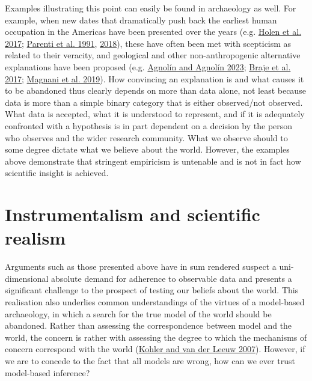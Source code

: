 \documentclass[
  12pt,
  a4paper,
  oneside]{book}
\begin{document}
Examples illustrating this point can easily be found in archaeology as well. For example, when new dates that dramatically push back the earliest human occupation in the Americas have been presented over the years (e.g. \protect\hyperlink{ref-holen2017}{Holen et al. 2017}; \protect\hyperlink{ref-parenti1991}{Parenti et al. 1991}, \protect\hyperlink{ref-parenti2018}{2018}), these have often been met with scepticism as related to their veracity, and geological and other non-anthropogenic alternative explanations have been proposed (e.g. \protect\hyperlink{ref-agnolin2023}{Agnolín and Agnolín 2023}; \protect\hyperlink{ref-braje2017}{Braje et al. 2017}; \protect\hyperlink{ref-magnani2019}{Magnani et al. 2019}). How convincing an explanation is and what causes it to be abandoned thus clearly depends on more than data alone, not least because data is more than a simple binary category that is either observed/not observed. What data is accepted, what it is understood to represent, and if it is adequately confronted with a hypothesis is in part dependent on a decision by the person who observes and the wider research community. What we observe should to some degree dictate what we believe about the world. However, the examples above demonstrate that stringent empiricism is untenable and is not in fact how scientific insight is achieved.

\hypertarget{instrumentalism-and-scientific-realism}{%
\section{Instrumentalism and scientific realism}\label{instrumentalism-and-scientific-realism}}

Arguments such as those presented above have in sum rendered suspect a uni-dimensional absolute demand for adherence to observable data and presents a significant challenge to the prospect of testing our beliefs about the world. This realisation also underlies common understandings of the virtues of a model-based archaeology, in which a search for the true model of the world should be abandoned. Rather than assessing the correspondence between model and the world, the concern is rather with assessing the degree to which the mechanisms of concern correspond with the world (\protect\hyperlink{ref-kohler2007}{Kohler and van der Leeuw 2007}). However, if we are to concede to the fact that all models are wrong, how can we ever trust model-based inference?
\end{document}
